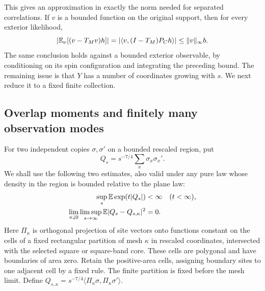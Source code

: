This gives an approximation in exactly the norm needed for separated
correlations.  If $v$ is a bounded function on the original support,
then for every exterior likelihood,
\begin{equation}
 |\mathbb E_\nu[(v-T_Mv)h]|
 =|\langle v,(I-T_M)P_Ch\rangle|
 \leq\|v\|_\infty b.
 \label{eq:transfer-testing-error}
\end{equation}
The same conclusion holds against a bounded exterior observable, by
conditioning on its spin configuration and integrating the preceding
bound.  The remaining issue is that $Y$ has a number of coordinates
growing with $s$.  We next reduce it to a fixed finite collection.

\subsection{Overlap moments and finitely many observation modes}

For two independent copies $\sigma,\sigma'$ on a bounded rescaled
region, put
\[
 Q_s=s^{-7/4}\sum_x\sigma_x\sigma_x'.
\]
We shall use the following two estimates, also valid under any pure law
whose density in the region is bounded relative to the plane law:
\begin{align}
 \sup_s\mathbb E\exp(t|Q_s|)&<\infty\quad(t<\infty),
 \label{eq:transfer-overlap-exponential}\\
 \lim_{\kappa\downarrow0}\limsup_{s\to\infty}
   \mathbb E|Q_s-Q_{s,\kappa}|^2&=0.
 \label{eq:transfer-overlap-projection}
\end{align}
Here $\Pi_\kappa$ is orthogonal projection of site vectors onto functions
constant on the cells of a fixed rectangular partition of mesh $\kappa$
in rescaled coordinates, intersected with the selected square or
square-band core.  These cells are polygonal and have boundaries of area
zero.  Retain the positive-area cells, assigning boundary sites to one
adjacent cell by a fixed rule.  The finite partition is fixed before
the mesh limit.  Define
$Q_{s,\kappa}=s^{-7/4}\langle\Pi_\kappa\sigma,
\Pi_\kappa\sigma'\rangle$.

